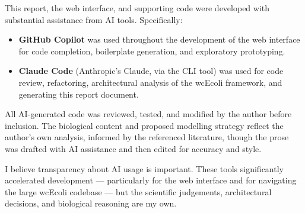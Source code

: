\documentclass[11pt,a4paper]{article}
\begin{document}
This report, the web interface, and supporting code were developed with
substantial assistance from AI tools.  Specifically:

\begin{itemize}[nosep]
  \item \textbf{GitHub Copilot} was used throughout the development of the web
    interface for code completion, boilerplate generation, and exploratory
    prototyping.
  \item \textbf{Claude Code} (Anthropic's Claude, via the CLI tool) was used
    for code review, refactoring, architectural analysis of the wcEcoli
    framework, and generating this report document.
\end{itemize}

All AI-generated code was reviewed, tested, and modified by the author before
inclusion.  The biological content and proposed modelling strategy reflect the
author's own analysis, informed by the referenced literature, though the prose
was drafted with AI assistance and then edited for accuracy and style.

I believe transparency about AI usage is important.  These tools significantly
accelerated development --- particularly for the web interface and for
navigating the large wcEcoli codebase --- but the scientific judgements,
architectural decisions, and biological reasoning are my own.

\vspace{1em}
\printbibliography
\end{document}
